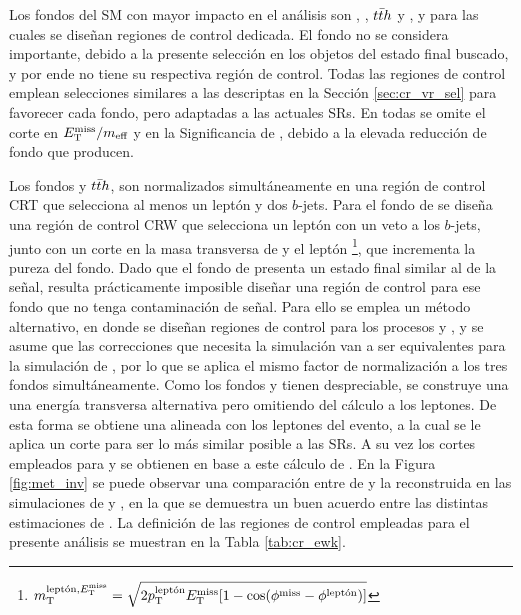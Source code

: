 Los fondos del SM con mayor impacto en el análisis son \wph, \ttbarph, $t\bar{t} h$ y \znunuph, y para las cuales se diseñan regiones de control dedicada. El fondo \phj no se considera importante, debido a la presente selección en los objetos del estado final buscado, y por ende no tiene su respectiva región de control. Todas las regiones de control emplean selecciones similares a las descriptas en la Sección \ref{sec:cr_vr_sel} para favorecer cada fondo, pero adaptadas a las actuales SRs. En todas se omite el corte en $E_{\text{T}}^{\text{miss}}/m_{\text{eff}}$ y en la Significancia de \met, debido a la elevada reducción de fondo que producen.


Los fondos \ttbarph y $t\bar{t} h$, son normalizados simultáneamente en una región de control CRT que selecciona al menos un leptón y dos $b$-jets. Para el fondo de \wph se diseña una región de control CRW que selecciona un leptón con un veto a los $b$-jets, junto con un corte en la masa transversa de \met y el leptón \footnote{$m_{\text{T}}^{\text{leptón}, E_{\text{T}}^{\text{miss}}} = \sqrt{2p_{\text{T}}^{\text{leptón}}E_{\text{T}}^{\text{miss}}[1-\cos(\phi^{\text{miss}}-\phi^{\text{leptón}})]}$}, que incrementa la pureza del fondo. Dado que el fondo de \znunuph presenta un estado final similar al de la señal, resulta prácticamente imposible diseñar una región de control para ese fondo que no tenga contaminación de señal. Para ello se emplea un método alternativo, en donde se diseñan regiones de control para los procesos \zeeph y \zmumuph, y se asume que las correcciones que necesita la simulación van a ser equivalentes para la simulación de \znunuph, por lo que se aplica el mismo factor de normalización a los tres fondos simultáneamente. Como los fondos \zeeph y \zmumuph tienen \met despreciable, se construye una una energía transversa alternativa pero omitiendo del cálculo a los leptones. De esta forma se obtiene una \met alineada con los leptones del evento, a la cual se le aplica un corte para ser lo más similar posible a las SRs. A su vez los cortes empleados para \dphijetmet y \dphigammet se obtienen en base a este cálculo de \met. En la Figura \ref{fig:met_inv} se puede observar una comparación entre \met de \znunuph y la reconstruida en las simulaciones de \zeeph y \zmumuph, en la que se demuestra un buen acuerdo entre las distintas estimaciones de \met. La definición de las regiones de control empleadas para el presente análisis se muestran en la Tabla \ref{tab:cr_ewk}.

